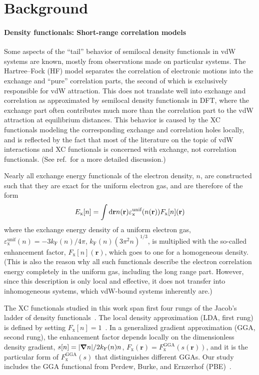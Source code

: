 \section{Background}

\paragraph{Density functionals: Short-range correlation models}

Some aspects of the ``tail'' behavior of semilocal density functionals in vdW systems are known, mostly from observations made on particular systems.
The Hartree--Fock (HF) model separates the correlation of electronic motions into the exchange and ``pure'' correlation parts, the second of which is exclusively responsible for vdW attraction.
This does not translate well into exchange and correlation as approximated by semilocal density functionals in DFT, where the exchange part often contributes much more than the correlation part to the vdW attraction at equilibrium distances.
This behavior is caused by the XC functionals modeling the corresponding exchange and correlation holes locally, and is reflected by the fact that most of the literature on the topic of vdW interactions and XC functionals is concerned with exchange, not correlation functionals.
(See ref.\,\cite{PengPRX16} for a more detailed discussion.)

Nearly all exchange energy functionals of the electron density, $n$, are constructed such that they are exact for the uniform electron gas, and are therefore of the form
\begin{equation}
  E_\mathrm x[n]=\int\mathrm d\mathbf rn(\mathbf r)\varepsilon^\text{unif}_\text x(n(\mathbf r))F_\mathrm x[n](\mathbf r)
  \label{eq:exchange-form}
\end{equation}
where the exchange energy density of a uniform electron gas, $\varepsilon^\text{unif}_\mathrm x(n)=-3k_\mathrm F(n)/4\pi$, $k_\mathrm F(n)(3\pi^2n)^{1/3}$, is multiplied with the so-called enhancement factor, $F_\mathrm x[n](\mathbf r)$, which goes to one for a homogeneous density.
(This is also the reason why all such functionals describe the electron correlation energy completely in the uniform gas, including the long range part.
However, since this description is only local and effective, it does not transfer into inhomogeneous systems, which vdW-bound systems inherently are.)

The XC functionals studied in this work span first four rungs of the Jacob's ladder of density functionals~\cite{PerdewACP01}.
The local density approximation (LDA, first rung) is defined by setting $F_\mathrm x[n]=1$~\cite{DiracMPCPS30}.
In a generalized gradient approximation (GGA, second rung), the enhancement factor depends locally on the dimensionless density gradient, $s[n]=\lvert\boldsymbol\nabla n\rvert/2k_\text F(n)n$, $F_\mathrm x(\mathbf r)=F^\text{GGA}_\mathrm x(s(\mathbf r))$, and it is the particular form of $F^\text{GGA}_\mathrm x(s)$ that distinguishes different GGAs.
Our study includes the GGA functional from Perdew, Burke, and Ernzerhof (PBE)~\cite{PerdewPRL96}.

